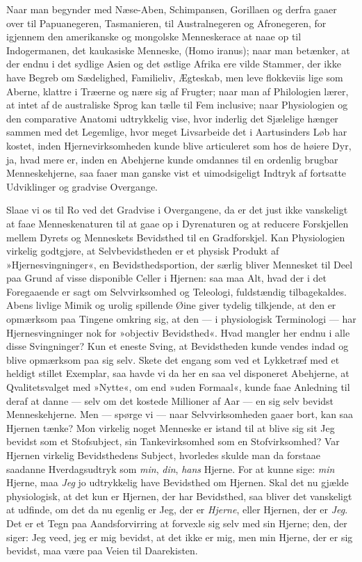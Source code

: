 \documentclass[12pt]{book}
\newcommand{\apage}[1]{\marginnote{\footnotesize\textit{[#1]}}}
\begin{document}
\apage{206} Naar man begynder med Næse-Aben, Schimpansen, Gorillaen og derfra gaaer
over til Papuanegeren, Tasmanieren, til Australnegeren og Afronegeren, for
igjennem den amerikanske og mongolske Menneskerace at naae op til
Indogermanen, det kaukasiske Menneske, (Homo iranus); naar man
betænker, at der endnu i det sydlige Asien og det østlige Afrika ere vilde
Stammer, der ikke have Begreb om Sædelighed, Familieliv, Ægteskab, men leve
flokkeviis lige som Aberne, klattre i Træerne og nære sig af Frugter; naar
man af Philologien lærer, at intet af de australiske Sprog kan tælle til
Fem inclusive; naar Physiologien og den comparative Anatomi udtrykkelig
vise, hvor inderlig det Sjælelige hænger sammen med det Legemlige, hvor
meget Livsarbeide det i Aartusinders Løb har kostet, inden Hjernevirksomheden
kunde blive articuleret som hos de høiere Dyr, ja, hvad mere er, inden en
Abehjerne kunde omdannes til en ordenlig brugbar Menneskehjerne, saa faaer
man ganske vist et uimodsigeligt Indtryk af fortsatte Udviklinger og
gradvise Overgange.

Slaae vi os til Ro ved det Gradvise i Overgangene, da er det just ikke
vanskeligt at faae Menneskenaturen til at gaae op i Dyrenaturen og at
reducere Forskjellen mellem Dyrets og Menneskets Bevidsthed til en
Gradforskjel. Kan Physiologien virkelig godtgjøre, at Selvbevidstheden er
et physisk Produkt af »Hjernesvingninger«, en Bevidsthedsportion, der
særlig bliver Mennesket til Deel paa Grund af visse disponible Celler i
Hjernen: saa maa Alt, hvad der i det Foregaaende er \apage{207} sagt om Selvvirksomhed
og Teleologi, fuldstændig tilbagekaldes. Abens livlige Mimik og urolig
spillende Øine giver tydelig tilkjende, at den er opmærksom paa Tingene
omkring sig, at den --- i physiologisk Terminologi --- har Hjernesvingninger
nok for »objectiv Bevidsthed«. Hvad mangler her endnu i alle disse
Svingninger? Kun et eneste Sving, at Bevidstheden kunde vendes indad og
blive opmærksom paa sig selv. Skete det engang som ved et Lykketræf med et
heldigt stillet Exemplar, saa havde vi da her en saa vel disponeret
Abehjerne, at Qvalitetsvalget med »Nytte«, om end »uden Formaal«, kunde
faae Anledning til deraf at danne --- selv om det kostede Millioner af Aar
--- en sig selv bevidst Menneskehjerne. Men --- spørge vi --- naar
Selvvirksomheden gaaer bort, kan saa Hjernen tænke? Mon virkelig noget
Menneske er istand til at blive sig sit Jeg bevidst som et Stofsubject, sin
Tankevirksomhed som en Stofvirksomhed? Var Hjernen virkelig Bevidsthedens
Subject, hvorledes skulde man da forstaae saadanne Hverdagsudtryk som \emph{min},
\emph{din}, \emph{hans} Hjerne. For at kunne sige: \emph{min} Hjerne, maa \emph{Jeg} jo udtrykkelig
have Bevidsthed om Hjernen. Skal det nu gjælde physiologisk, at det kun er
Hjernen, der har Bevidsthed, saa bliver det vanskeligt at udfinde, om det
da nu egenlig er Jeg, der er \emph{Hjerne}, eller Hjernen, der er \emph{Jeg}. Det er et
Tegn paa Aandsforvirring at forvexle sig selv med sin Hjerne; den, der
siger: Jeg veed, jeg er mig bevidst, at det ikke er mig, men min Hjerne,
der er sig bevidst, maa være paa Veien til Daarekisten.
\end{document}

